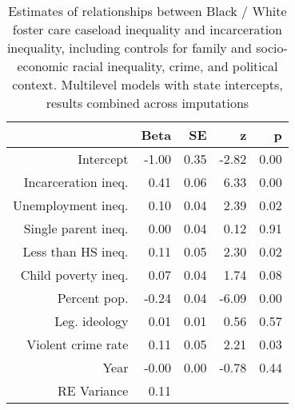 \begin{table}[ht]
\centering
\caption{Estimates of relationships between Black / White foster care caseload inequality and incarceration inequality, including controls for family and socio-economic racial inequality, crime, and political context. Multilevel models with state intercepts, results combined across imputations} 
\begin{tabular}{rrrrr}
  \hline
 & Beta & SE & z & p \\ 
  \hline
Intercept & -1.00 & 0.35 & -2.82 & 0.00 \\ 
  Incarceration ineq. & 0.41 & 0.06 & 6.33 & 0.00 \\ 
  Unemployment ineq. & 0.10 & 0.04 & 2.39 & 0.02 \\ 
  Single parent ineq. & 0.00 & 0.04 & 0.12 & 0.91 \\ 
  Less than HS ineq. & 0.11 & 0.05 & 2.30 & 0.02 \\ 
  Child poverty ineq. & 0.07 & 0.04 & 1.74 & 0.08 \\ 
  Percent pop. & -0.24 & 0.04 & -6.09 & 0.00 \\ 
  Leg. ideology & 0.01 & 0.01 & 0.56 & 0.57 \\ 
  Violent crime rate & 0.11 & 0.05 & 2.21 & 0.03 \\ 
  Year & -0.00 & 0.00 & -0.78 & 0.44 \\ 
  RE Variance & 0.11 &  &  &  \\ 
   \hline
\end{tabular}
\end{table}
